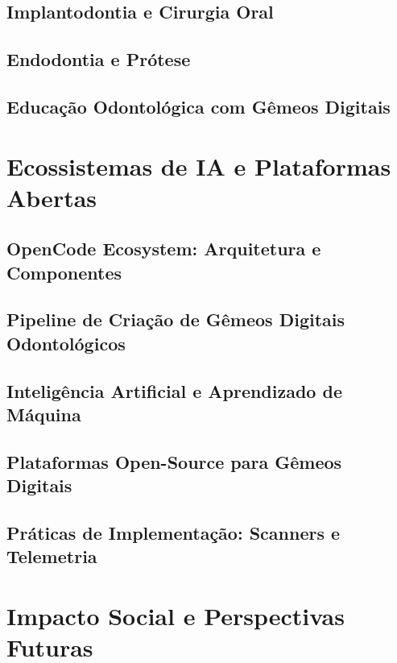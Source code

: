 \documentclass[12pt,a4paper,oneside,openright]{abntex2}
\theoremstyle{definition}
\begin{document}
\chapter{Implantodontia e Cirurgia Oral} \label{ch:implantodontia}

\chapter{Endodontia e Prótese} \label{ch:endodontia}

\chapter{Educação Odontológica com Gêmeos Digitais} \label{ch:educacao}


\part{Ecossistemas de IA e Plataformas Abertas}
\chapter{OpenCode Ecosystem: Arquitetura e Componentes} \label{ch:opencode}

\chapter{Pipeline de Criação de Gêmeos Digitais Odontológicos} \label{ch:pipeline}

\chapter{Inteligência Artificial e Aprendizado de Máquina} \label{ch:ia}

\chapter{Plataformas Open-Source para Gêmeos Digitais} \label{ch:plataformas}

\chapter{Práticas de Implementação: Scanners e Telemetria} \label{ch:praticas}


\part{Impacto Social e Perspectivas Futuras}
\end{document}
